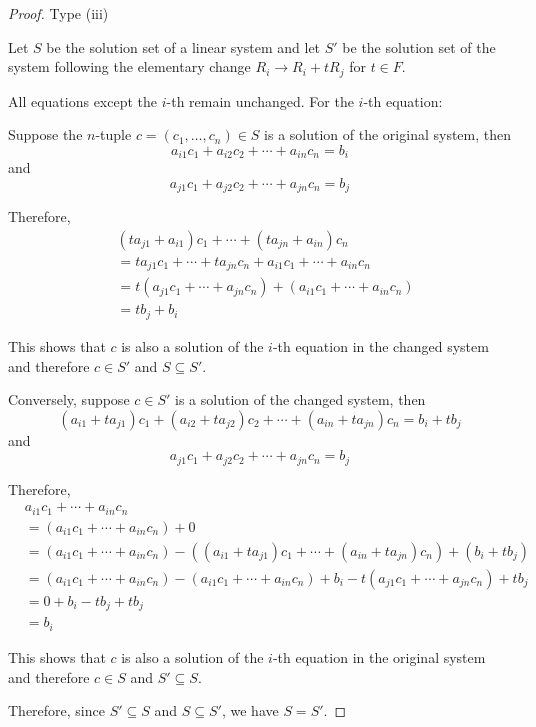 \begin{proof} Type (iii)

Let $S$ be the solution set of a linear system and let $S'$ be the solution set of the system following the elementary change $R_i \to R_i + tR_j$ for $t \in F$.

All equations except the $i$-th remain unchanged. For the $i$-th equation:

Suppose the $n$-tuple $c = (c_1, \ldots, c_n) \in S$ is a solution of the original system, then
\[a_{i1}c_1 + a_{i2}c_2 + \cdots + a_{in}c_n = b_i\]
and
\[a_{j1}c_1 + a_{j2}c_2 + \cdots + a_{jn}c_n = b_j\]

Therefore,
\begin{align*}
&(ta_{j1} + a_{i1})c_1 + \cdots + (ta_{jn} + a_{in})c_n\\
&= ta_{j1}c_1 + \cdots + ta_{jn}c_n + a_{i1}c_1 + \cdots + a_{in}c_n\\
&= t(a_{j1}c_1 + \cdots + a_{jn}c_n) + (a_{i1}c_1 + \cdots + a_{in}c_n)\\
&= tb_j + b_i
\end{align*}

This shows that $c$ is also a solution of the $i$-th equation in the changed system and therefore $c \in S'$ and $S \subseteq S'$.

Conversely, suppose $c \in S'$ is a solution of the changed system, then
\[(a_{i1} + ta_{j1})c_1 + (a_{i2} + ta_{j2})c_2 + \cdots + (a_{in} + ta_{jn})c_n = b_i + tb_j\]
and
\[a_{j1}c_1 + a_{j2}c_2 + \cdots + a_{jn}c_n = b_j\]

Therefore,
\begin{align*}
&a_{i1}c_1 + \cdots + a_{in}c_n\\
&= (a_{i1}c_1 + \cdots + a_{in}c_n) + 0\\
&= (a_{i1}c_1 + \cdots + a_{in}c_n) - ((a_{i1} + ta_{j1})c_1 + \cdots + (a_{in} + ta_{jn})c_n) + (b_i + tb_j)\\
&= (a_{i1}c_1 + \cdots + a_{in}c_n) - (a_{i1}c_1 + \cdots + a_{in}c_n) + b_i - t(a_{j1}c_1 + \cdots + a_{jn}c_n) + tb_j\\
&= 0 + b_i - tb_j + tb_j\\
&= b_i
\end{align*}

This shows that $c$ is also a solution of the $i$-th equation in the original system and therefore $c \in S$ and $S' \subseteq S$.

Therefore, since $S' \subseteq S$ and $S \subseteq S'$, we have $S = S'$.
\end{proof}



